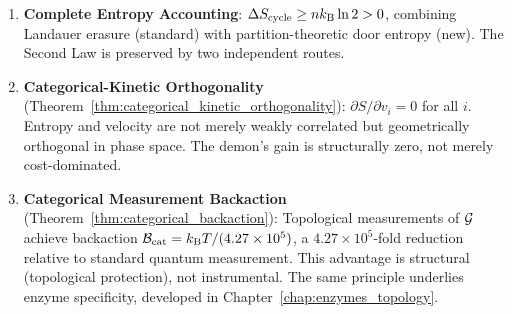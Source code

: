 \begin{chapterbox}[title=Chapter 5 --- Key Results Established]
\begin{enumerate}[label=\textbf{\arabic*.}]
  \item \textbf{Complete Entropy Accounting}: $\Delta S_{\mathrm{cycle}} \geq nk_{\mathrm{B}}\ln 2 > 0$,
        combining Landauer erasure (standard) with partition-theoretic door entropy
        (new). The Second Law is preserved by two independent routes.

  \item \textbf{Categorical-Kinetic Orthogonality} (Theorem~\ref{thm:categorical_kinetic_orthogonality}):
        $\partial S / \partial v_i = 0$ for all $i$. Entropy and velocity are
        not merely weakly correlated but geometrically orthogonal in phase space.
        The demon's gain is structurally zero, not merely cost-dominated.

  \item \textbf{Categorical Measurement Backaction} (Theorem~\ref{thm:categorical_backaction}):
        Topological measurements of $\mathcal{G}$ achieve backaction
        $\mathcal{B}_{\mathrm{cat}} = k_{\mathrm{B}} T / (4.27 \times 10^5)$, a
        $4.27 \times 10^5$-fold reduction relative to standard quantum
        measurement. This advantage is structural (topological protection),
        not instrumental. The same principle underlies enzyme specificity,
        developed in Chapter~\ref{chap:enzymes_topology}.
\end{enumerate}
\end{chapterbox}
